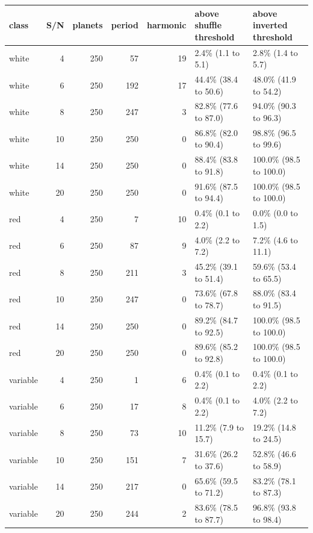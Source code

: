 \begin{tabular}{lrrrrll}
\toprule
class & S/N & planets & period & harmonic & above shuffle threshold & above inverted threshold \\
\midrule
white & 4 & 250 & 57 & 19 & 2.4\% (1.1 to 5.1) & 2.8\% (1.4 to 5.7) \\
white & 6 & 250 & 192 & 17 & 44.4\% (38.4 to 50.6) & 48.0\% (41.9 to 54.2) \\
white & 8 & 250 & 247 & 3 & 82.8\% (77.6 to 87.0) & 94.0\% (90.3 to 96.3) \\
white & 10 & 250 & 250 & 0 & 86.8\% (82.0 to 90.4) & 98.8\% (96.5 to 99.6) \\
white & 14 & 250 & 250 & 0 & 88.4\% (83.8 to 91.8) & 100.0\% (98.5 to 100.0) \\
white & 20 & 250 & 250 & 0 & 91.6\% (87.5 to 94.4) & 100.0\% (98.5 to 100.0) \\
red & 4 & 250 & 7 & 10 & 0.4\% (0.1 to 2.2) & 0.0\% (0.0 to 1.5) \\
red & 6 & 250 & 87 & 9 & 4.0\% (2.2 to 7.2) & 7.2\% (4.6 to 11.1) \\
red & 8 & 250 & 211 & 3 & 45.2\% (39.1 to 51.4) & 59.6\% (53.4 to 65.5) \\
red & 10 & 250 & 247 & 0 & 73.6\% (67.8 to 78.7) & 88.0\% (83.4 to 91.5) \\
red & 14 & 250 & 250 & 0 & 89.2\% (84.7 to 92.5) & 100.0\% (98.5 to 100.0) \\
red & 20 & 250 & 250 & 0 & 89.6\% (85.2 to 92.8) & 100.0\% (98.5 to 100.0) \\
variable & 4 & 250 & 1 & 6 & 0.4\% (0.1 to 2.2) & 0.4\% (0.1 to 2.2) \\
variable & 6 & 250 & 17 & 8 & 0.4\% (0.1 to 2.2) & 4.0\% (2.2 to 7.2) \\
variable & 8 & 250 & 73 & 10 & 11.2\% (7.9 to 15.7) & 19.2\% (14.8 to 24.5) \\
variable & 10 & 250 & 151 & 7 & 31.6\% (26.2 to 37.6) & 52.8\% (46.6 to 58.9) \\
variable & 14 & 250 & 217 & 0 & 65.6\% (59.5 to 71.2) & 83.2\% (78.1 to 87.3) \\
variable & 20 & 250 & 244 & 2 & 83.6\% (78.5 to 87.7) & 96.8\% (93.8 to 98.4) \\
\bottomrule
\end{tabular}
